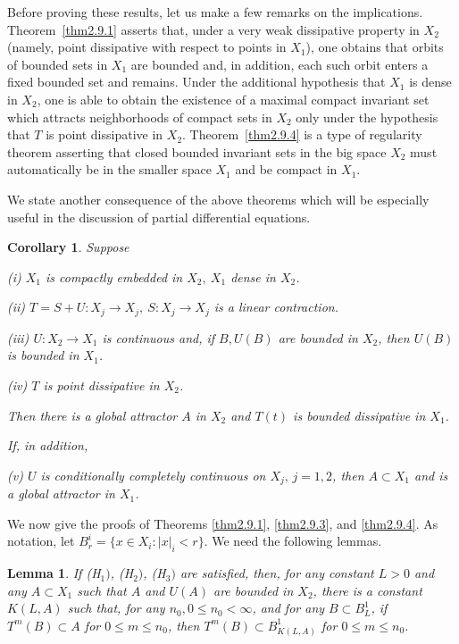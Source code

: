\documentclass{surv-l}
\theoremstyle{plain}
\newtheorem{corollary}[theorem]{Corollary}
\newtheorem{lemma}[theorem]{Lemma}
\theoremstyle{definition}
\numberwithin{equation}{section}
\numberwithin{figure}{chapter}
\begin{document}
Before proving these results, let us make a few remarks on the implications. Theorem~\ref{thm2.9.1} asserts that, under a very weak dissipative property in $X_{2}$ (namely, point dissipative with respect to points in $X_{1}$), one obtains that orbits of bounded sets in $X_{1}$ are bounded and, in addition, each such orbit enters a fixed bounded set and remains. Under the additional hypothesis that $X_{1}$ is dense in $X_{2}$, one is able to obtain the existence of a maximal compact invariant set which attracts neighborhoods of compact sets in $X_{2}$ only under the hypothesis that $T$ is point dissipative in $X_{2}$. Theorem~\ref{thm2.9.4} is a type of regularity theorem asserting that closed bounded invariant sets in the big space $X_{2}$ must automatically be in the smaller space $X_{1}$ and be compact in $X_{1}$.

We state another consequence of the above theorems which will be especially useful in the discussion of partial differential equations.

\begin{corollary}\label{cor2.9.5} Suppose

\emph{(i)} $X_{1}$ is compactly embedded in $X_{2},\ X_{1}$ dense in $X_{2}$.

\emph{(ii)} $T=S+U\!: X_{j}\rightarrow X_{j},\ S\!:X_{j}\rightarrow X_{j}$ is a linear contraction.

\emph{(iii)} $U\!:X_{2}\rightarrow X_{1}$ is continuous and, if $B, U(B)$ are bounded in $X_{2}$, then $U(B)$ is bounded in $X_{1}$.

\emph{(iv)} $T$ is point dissipative in $X_{2}$.

\noindent Then there is a global attractor $A$ in $X_{2}$ and $T(t)$ is bounded dissipative in $X_{1}$.

If, in addition,

\emph{(v)} $U$ is conditionally completely continuous on $X_{j},\, j=1,2$, then $A\subset X_{1}$ and is a global attractor in $X_{1}$.
\end{corollary}

We now give the proofs of Theorems \ref{thm2.9.1}, \ref{thm2.9.3}, and \ref{thm2.9.4}. As notation, let $B_{r}^{i}=\{x\in X_{i}\!:|x|_{i}<r\}$. We need the following lemmas.

\begin{lemma}\label{lem2.9.6} If \emph{(H}$_{1})$, \emph{(H}$_{2})$, \emph{(H}$_{3})$ are satisfied, then, for any constant $L>0$ and any $A\subset X_{1}$ such that $A$ and $U(A)$ are bounded in $X_{2}$, there is a constant $K(L, A)$ such that, for any $n_{0}, 0\leq n_{0}<\infty$, and for any $B\subset B_{L}^{1}$, if $T^{m}(B)\subset A$ for $0\leq m\leq n_{0}$, then $T^{m}(B)\subset B_{K(L,A)}^{1}$ for $0\leq m\leq n_{0}$.
\end{lemma}
\end{document}
